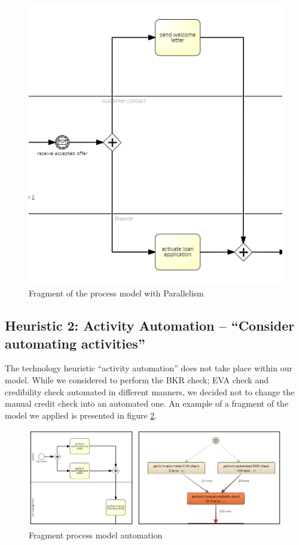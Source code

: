 \documentclass[a4paper]{article} %
\begin{document}
\begin{figure}
\centering
\includegraphics[scale=0.4]{h2}
\caption{Fragment of the process model with Parallelism}
\label{H2}
\end{figure}

\subsection{Heuristic 2: Activity Automation – “Consider automating activities”}
The technology heuristic “activity automation” does not take place within our model. While we considered to perform the BKR check; EVA check and credibility check automated in different manners, we decided not to change the manual credit check into an automated one. An example of a fragment of the model we applied is presented in figure \ref{H3}.

\begin{figure}[H]
\centering
\includegraphics[scale=0.7]{h3}
\caption{Fragment process model automation}
\label{H3}
\end{figure}
\end{document}
